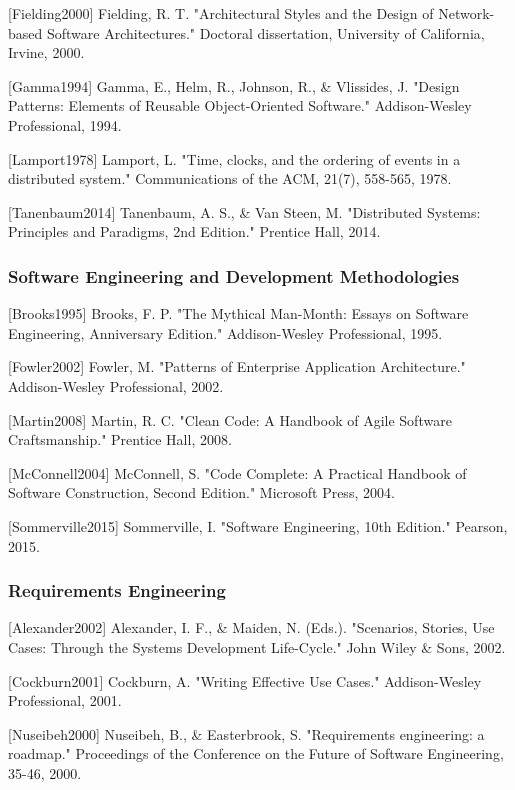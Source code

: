 \documentclass[12pt,a4paper]{report}
\begin{document}
{{[Fielding2000] Fielding, R. T. "Architectural Styles and the Design of Network-based Software Architectures." Doctoral
dissertation, University of California, Irvine, 2000.

[Gamma1994] Gamma, E., Helm, R., Johnson, R., \& Vlissides, J. "Design Patterns: Elements of Reusable Object-Oriented
Software." Addison-Wesley Professional, 1994.

[Lamport1978] Lamport, L. "Time, clocks, and the ordering of events in a distributed system." Communications of the ACM,
21(7), 558-565, 1978.

[Tanenbaum2014] Tanenbaum, A. S., \& Van Steen, M. "Distributed Systems: Principles and Paradigms, 2nd Edition." Prentice
Hall, 2014.

\subsubsection{Software Engineering and Development Methodologies}

[Brooks1995] Brooks, F. P. "The Mythical Man-Month: Essays on Software Engineering, Anniversary Edition." Addison-Wesley
Professional, 1995.

[Fowler2002] Fowler, M. "Patterns of Enterprise Application Architecture." Addison-Wesley Professional, 2002.

[Martin2008] Martin, R. C. "Clean Code: A Handbook of Agile Software Craftsmanship." Prentice Hall, 2008.

[McConnell2004] McConnell, S. "Code Complete: A Practical Handbook of Software Construction, Second Edition." Microsoft
Press, 2004.

[Sommerville2015] Sommerville, I. "Software Engineering, 10th Edition." Pearson, 2015.

\subsubsection{Requirements Engineering}

[Alexander2002] Alexander, I. F., \& Maiden, N. (Eds.). "Scenarios, Stories, Use Cases: Through the Systems Development
Life-Cycle." John Wiley \& Sons, 2002.

[Cockburn2001] Cockburn, A. "Writing Effective Use Cases." Addison-Wesley Professional, 2001.

[Nuseibeh2000] Nuseibeh, B., \& Easterbrook, S. "Requirements engineering: a roadmap." Proceedings of the Conference on
the Future of Software Engineering, 35-46, 2000.

}}
\end{document}
